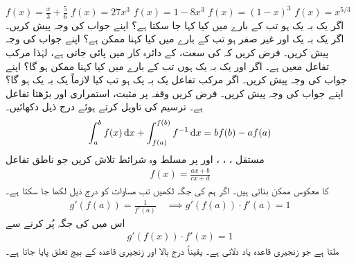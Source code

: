 $f(x)=\tfrac{x}{3}+\tfrac{5}{6}$
$f(x)=27x^3$
$f(x)=1-8x^3$
$f(x)=(1-x)^3$
$f(x)=x^{5/3}$
\\
اگر  یک بہ یک ہو تب  کے بارے میں کیا کہا جا سکتا ہے؟ اپنے جواب کی وجہ پیش کریں۔
اگر  یک بہ یک اور غیر صفر ہو تب  کے بارے میں کیا کہنا ممکن ہے؟ اپنے جواب کی وجہ پیش کریں۔
فرض کریں کہ  کی سعت،  کے دائرہ کار میں پائی جاتی ہے، لہٰذا مرکب تفاعل  معین ہے۔ اگر  اور  یک بہ یک ہوں تب  کے بارے میں کیا کہنا ممکن ہو گا؟ اپنے جواب کی وجہ پیش کریں۔
اگر مرکب تفاعل  یک بہ یک ہو تب کیا  لازماً یک بہ یک ہو گا؟ اپنے جواب کی وجہ پیش کریں۔
فرض کریں وقفہ  پر  مثبت، استمراری اور بڑھتا تفاعل  ہے۔ ترسیم کی تاویل کرتے ہوئے درج ذیل دکھائیں۔
\begin{align*}
\int_a^bf(x)\dif x+\int_{f(a)}^{f(b)}f^{-1}\dif x=bf(b)-af(a)
\end{align*}
مستقل ، ، ،  اور  پر مسلط وہ شرائط تلاش کریں جو ناطق تفاعل
\begin{align*}
f(x)=\frac{ax+b}{cx+d}
\end{align*}
کا معکوس ممکن بناتی ہیں۔
اگر ہم  کی جگہ  لکھیں تب مساوات  کو درج ذیل لکھا جا سکتا ہے۔
\begin{align*}
g'(f(a))=\frac{1}{f'(a)}\quad \implies g'(f(a))\cdot f'(a)=1
\end{align*}
اس میں  کی جگہ  پُر کرنے سے  
\begin{align*}
g'(f(x))\cdot f'(x)=1
\end{align*}
ملتا ہے جو زنجیری قاعدہ یاد دلاتی ہے۔ یقیناً درج بالا اور زنجیری قاعدہ کے بیچ تعلق پایا جاتا ہے۔

